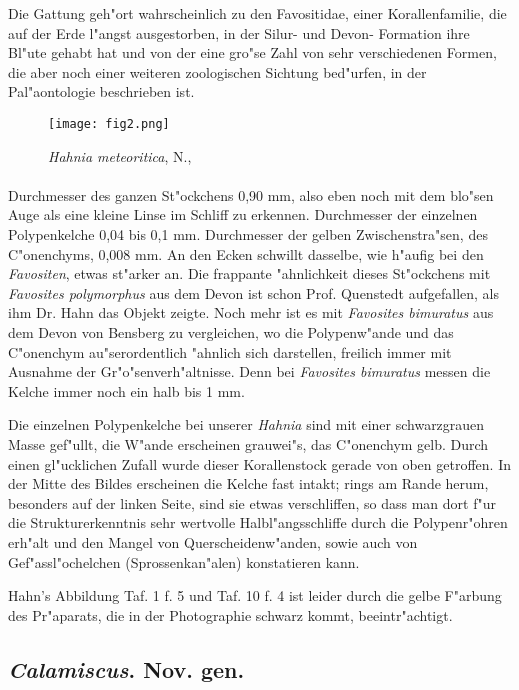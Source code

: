 \documentclass[a4paper, 11pt, oneside]{article}
\begin{document}
Die Gattung geh"ort wahrscheinlich zu den Favositidae, einer Korallenfamilie, die auf der Erde l"angst ausgestorben, in der Silur- und Devon- Formation ihre Bl"ute gehabt hat und von der eine gro"se Zahl von sehr verschiedenen Formen, die aber noch einer weiteren zoologischen Sichtung bed"urfen, in der Pal"aontologie beschrieben ist.
\begin{figure}[H]
\centering
\texttt{[image: fig2.png]}
\caption{\emph{Hahnia meteoritica}, N., }
\end{figure}
\paragraph{}
Durchmesser des ganzen St"ockchens 0,90 mm, also eben noch mit dem blo"sen Auge als eine kleine Linse im Schliff zu erkennen. Durchmesser der einzelnen Polypenkelche 0,04 bis 0,1 mm. Durchmesser der gelben Zwischenstra"sen, des C"onenchyms, 0,008 mm. An den Ecken schwillt dasselbe, wie h"aufig bei den \emph{Favositen}, etwas st"arker an. Die frappante "ahnlichkeit dieses St"ockchens mit \emph{Favosites polymorphus} aus dem Devon ist schon Prof. Quenstedt aufgefallen, als ihm Dr. Hahn das Objekt zeigte. Noch mehr ist es mit \emph{Favosites bimuratus} aus dem Devon von Bensberg zu vergleichen, wo die Polypenw"ande und das C"onenchym au"serordentlich "ahnlich sich darstellen, freilich immer mit Ausnahme der Gr"o"senverh"altnisse. Denn bei \emph{Favosites bimuratus} messen die Kelche immer noch ein halb bis 1 mm.

Die einzelnen Polypenkelche bei unserer \emph{Hahnia} sind mit einer schwarzgrauen Masse gef"ullt, die W"ande erscheinen grauwei"s, das C"onenchym gelb. Durch einen gl"ucklichen Zufall wurde dieser Korallenstock gerade von oben getroffen. In der Mitte des Bildes erscheinen die Kelche fast intakt; rings am Rande herum, besonders auf der linken Seite, sind sie etwas verschliffen, so dass man dort f"ur die Strukturerkenntnis sehr wertvolle Halbl"angsschliffe durch die Polypenr"ohren erh"alt und den Mangel von Querscheidenw"anden, sowie auch von Gef"assl"ochelchen (Sprossenkan"alen) konstatieren kann.

Hahn's Abbildung Taf. 1 f. 5 und Taf. 10 f. 4 ist leider durch die gelbe F"arbung des Pr"aparats, die in der Photographie schwarz kommt, beeintr"achtigt.
\subsection{\emph{Calamiscus}. Nov. gen.}
\end{document}

